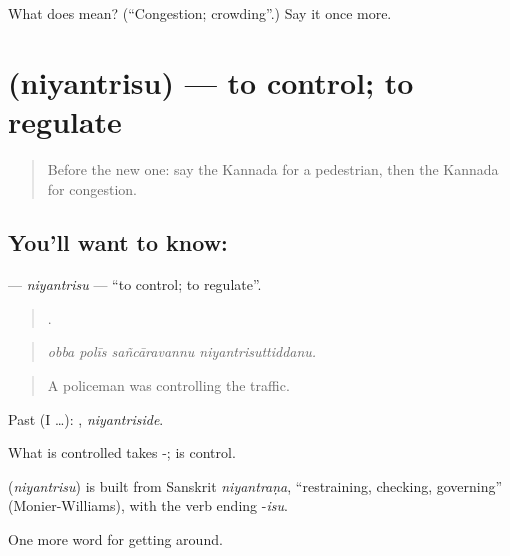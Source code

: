 \begin{tcolorbox}[breakable,colback=teal!4,colframe=teal!35!black,title={Before you move on}]
What does  mean? (\textquotedblleft{}Congestion; crowding\textquotedblright{}.) Say it once more.
\end{tcolorbox}
\section[\texorpdfstring{\kn{ನಿಯಂತ್ರಿಸು} (niyantrisu)}{ನಿಯಂತ್ರಿಸು (niyantrisu)}]{ (niyantrisu) — to control; to regulate}

\label{lesson:KA-C443-niyantrisu}



\begin{quote}
Before the new one: say the Kannada for a pedestrian, then the Kannada for congestion.
\end{quote}

\subsection*{You'll want to know: }
\textbf{} — \emph{niyantrisu} — \textquotedblleft{}to control; to regulate\textquotedblright{}.

\begin{quote}
   .
\end{quote}

\begin{quote}
\emph{obba polīs sañcāravannu niyantrisuttiddanu.}
\end{quote}

\begin{quote}
A policeman was controlling the traffic.
\end{quote}

Past (I …): , \emph{niyantriside}.

What is controlled takes -;  is control.

\begin{cousinweb}
\textbf{} (\emph{niyantrisu}) is built from Sanskrit \emph{niyantraṇa}, \textquotedblleft{}restraining, checking, governing\textquotedblright{} (Monier-Williams), with the verb ending -\emph{isu}.
\end{cousinweb}

\begin{grammarlens}[title={What you've built}]
One more word for getting around.
\end{grammarlens}

